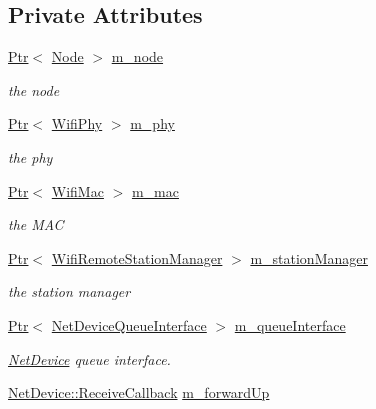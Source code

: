 \subsection*{Private Attributes}
\begin{DoxyCompactItemize}
\item 
\hyperlink{classns3_1_1Ptr}{Ptr}$<$ \hyperlink{classns3_1_1Node}{Node} $>$ \hyperlink{classns3_1_1WifiNetDevice_abe1f879c0ba57b01b25fc70f46669434}{m\+\_\+node}
\begin{DoxyCompactList}\small\item\em the node \end{DoxyCompactList}\item 
\hyperlink{classns3_1_1Ptr}{Ptr}$<$ \hyperlink{classns3_1_1WifiPhy}{Wifi\+Phy} $>$ \hyperlink{classns3_1_1WifiNetDevice_ab31c82a6d5d8f2b6fec1dbc3b9a3f66f}{m\+\_\+phy}
\begin{DoxyCompactList}\small\item\em the phy \end{DoxyCompactList}\item 
\hyperlink{classns3_1_1Ptr}{Ptr}$<$ \hyperlink{classns3_1_1WifiMac}{Wifi\+Mac} $>$ \hyperlink{classns3_1_1WifiNetDevice_ad7a7042abee418dcdbf4b4a870f5d4cf}{m\+\_\+mac}
\begin{DoxyCompactList}\small\item\em the M\+AC \end{DoxyCompactList}\item 
\hyperlink{classns3_1_1Ptr}{Ptr}$<$ \hyperlink{classns3_1_1WifiRemoteStationManager}{Wifi\+Remote\+Station\+Manager} $>$ \hyperlink{classns3_1_1WifiNetDevice_a9d7aa80a952acbbc8485bd26479c6014}{m\+\_\+station\+Manager}
\begin{DoxyCompactList}\small\item\em the station manager \end{DoxyCompactList}\item 
\hyperlink{classns3_1_1Ptr}{Ptr}$<$ \hyperlink{classns3_1_1NetDeviceQueueInterface}{Net\+Device\+Queue\+Interface} $>$ \hyperlink{classns3_1_1WifiNetDevice_a68bbd158f4112a8ea7edc759783cb333}{m\+\_\+queue\+Interface}
\begin{DoxyCompactList}\small\item\em \hyperlink{classns3_1_1NetDevice}{Net\+Device} queue interface. \end{DoxyCompactList}\item 
\hyperlink{classns3_1_1NetDevice_ad5e5e1ca187472bc2ba99575d8def568}{Net\+Device\+::\+Receive\+Callback} \hyperlink{classns3_1_1WifiNetDevice_a5be7dca73f370729fee15c73bec55867}{m\+\_\+forward\+Up}

\end{DoxyCompactItemize}
